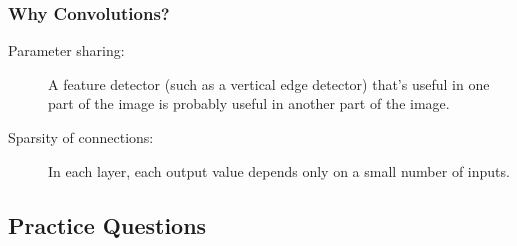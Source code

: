 \subsubsection{Why Convolutions?}
\begin{description}
    \item[Parameter sharing:] A feature detector (such as a vertical edge detector) that’s useful in one part of the image is probably useful in another part of the image.
    \item[Sparsity of connections:] In each layer, each output value depends only on a small number of inputs.
\end{description}

\subsection{Practice Questions}

